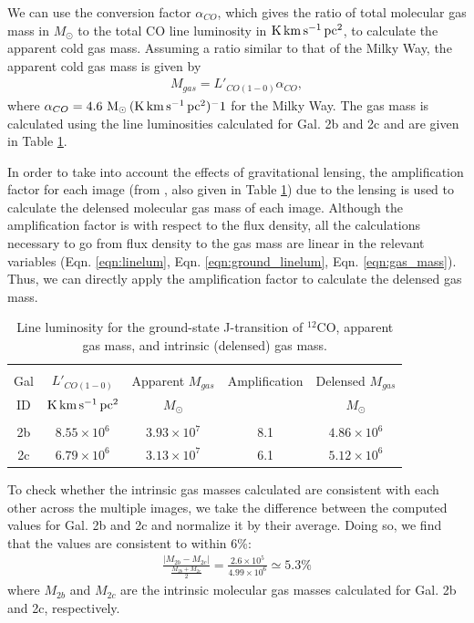 \documentclass[11pt]{article}
\begin{document}
We can use the conversion factor $\alpha_{CO}$, which gives the ratio of total molecular gas mass in $M_\odot$ to the total CO line luminosity in ${\rm K\,km\,s^{-1}\,pc^2}$, to calculate the apparent cold gas mass. Assuming a ratio similar to that of the Milky Way, the apparent cold gas mass is given by 
\begin{align}\label{eqn:gas_mass}
	M_{gas} = L'_{CO(1-0)} \alpha_{CO},
\end{align}
where $\alpha_{CO} = 4.6~{\rm M_\odot\,(K\,km\,s^{-1}\,pc^2)^-1}$ for the Milky Way. The gas mass is calculated using the line luminosities calculated for Gal. 2b and 2c and are given in Table \ref{table:gas_mass}.

In order to take into account the effects of gravitational lensing, the amplification factor for each image (from \cite{MacKenzie2014}, also given in Table \ref{table:gas_mass}) due to the lensing is used to calculate the delensed molecular gas mass of each image. Although the amplification factor is with respect to the flux density, all the calculations necessary to go from flux density to the gas mass are linear in the relevant variables (Eqn. \ref{eqn:linelum}, Eqn. \ref{eqn:ground_linelum}, Eqn. \ref{eqn:gas_mass}). Thus, we can directly apply the amplification factor to calculate the delensed gas mass. 

\begin{table}[!htbp]
\centering
\begin{tabular}{ccccc}
\hline \\[-0.25cm]
Gal & $L'_{CO(1-0)}$             & Apparent $M_{gas}$ & Amplification & Delensed $M_{gas}$ \\
ID  & $\rm{K\,km\,s^{-1}\,pc^2}$ & $M_\odot$          &               & $M_\odot$          \\[0.1cm]
\hline \\[-0.25cm]
2b & $8.55\times 10^{6}$ & $3.93\times 10^{7}$ & 8.1 & $4.86\times 10^{6}$ \\
2c & $6.79\times 10^{6}$ & $3.13\times 10^{7}$ & 6.1 & $5.12\times 10^{6}$ \\
\hline
\end{tabular}
\caption{Line luminosity for the ground-state J-transition of $^{12}$CO, apparent gas mass, and intrinsic (delensed) gas mass.}
\label{table:gas_mass}
\end{table}

To check whether the intrinsic gas masses calculated are consistent with each other across the multiple images, we take the difference between the computed values for Gal. 2b and 2c and normalize it by their average. Doing so, we find that the values are consistent to within 6\%: 
\begin{align}
    \frac{|M_{2b} - M_{2c}|}{\frac{M_{2b}+M_{2c}}{2}} = \frac{2.6\times 10^{5}}{4.99\times 10^{6}} \simeq 5.3\%
\end{align}
where $M_{2b}$ and $M_{2c}$ are the intrinsic molecular gas masses calculated for Gal. 2b and 2c, respectively. 
\end{document}
